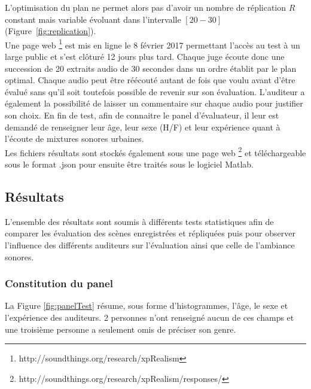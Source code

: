 L'optimisation du plan ne permet alors pas d'avoir un nombre de réplication $R$ constant mais variable évoluant dans l'intervalle $\left[20-30 \right]$ (Figure~\ref{fig:replication}). \\

Une page web \footnote{http://soundthings.org/research/xpRealism} est mis en ligne le 8 février 2017 permettant l'accès au test à un large public et s'est clôturé 12 jours plus tard. Chaque juge écoute donc une succession de 20 extraits audio de 30 secondes dans un ordre établit par le plan optimal. Chaque audio peut être réécouté autant de fois que voulu avant d'être évalué sans qu'il soit toutefois possible de revenir sur son évaluation. L'auditeur a également la possibilité de laisser un commentaire sur chaque audio pour justifier son choix. En fin de test, afin de connaitre le panel d'évaluateur, il leur est demandé de renseigner leur âge, leur sexe (H/F) et leur expérience quant à l'écoute de mixtures sonores urbaines.\\

Les fichiers résultats sont stockés également sous une page web \footnote{http://soundthings.org/research/xpRealism/responses/} et téléchargeable sous le format .json pour ensuite être traités sous le logiciel Matlab.\\

\subsection{Résultats}

L'ensemble des résultats sont soumis à différents tests statistiques afin de comparer les évaluation des scènes enregistrées et répliquées puis pour observer l'influence des différents auditeurs sur l'évaluation ainsi que celle de l'ambiance sonores.

\subsubsection{Constitution du panel}

La Figure \ref{fig:panelTest} résume, sous forme d'histogrammes, l'âge, le sexe et l'expérience des auditeurs. 2 personnes n'ont renseigné aucun de ces champs et une troisième personne a seulement omis de préciser son genre.\\

